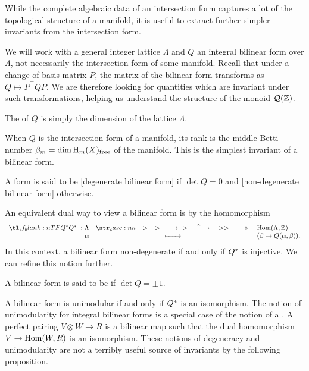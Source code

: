 While the complete algebraic data of an intersection form captures a lot of the topological structure of a manifold, it is useful to extract further simpler invariants from the intersection form.

We will work with a general integer lattice $\Lambda$ and $Q$ an integral bilinear form over $\Lambda$, not necessarily the intersection form of some manifold. Recall that under a change of basis matrix $P$, the matrix of the bilinear form transforms as $Q\mapsto P^\intercal QP$. We are therefore looking for quantities which are invariant under such transformations, helping us understand the structure of the monoid $\mathcal{Q}(\mathbb{Z})$.

\begin{definition}
	The  of $Q$ is simply the dimension of the lattice $\Lambda$.
\end{definition}

When $Q$ is the intersection form of a manifold, its rank is the middle Betti number $\beta_m = \dim \operatorname{H}_m(X)_{\textrm{free}}$ of the manifold. This is the simplest invariant of a bilinear form.

\begin{definition}
	A form is said to be [degenerate bilinear form] if $\det Q=0$ and [non-degenerate bilinear form] otherwise.
\end{definition}

An equivalent dual way to view a bilinear form is by the homomorphism
\[
	\lkxfunc{Q^\d}{\Lambda}{\Hom(\Lambda, \Z)}{\alpha}{(\beta\mapsto Q(\alpha,\beta)).}
\]
In this context, a bilinear form non-degenerate if and only if $Q^*$ is injective. We can refine this notion further.
\begin{definition}
	A bilinear form is said to be  if $\det Q=\pm 1$. 
\end{definition}
A bilinear form is unimodular if and only if $Q^*$ is an isomorphism. The notion of unimodularity for integral bilinear forms is a special case of the notion of a . A perfect pairing $V\otimes W \to R$ is a bilinear map such that the dual homomorphism $V \to \operatorname{Hom}(W, R)$ is an isomorphism. These notions of degeneracy and unimodularity are not a terribly useful source of invariants by the following proposition.

